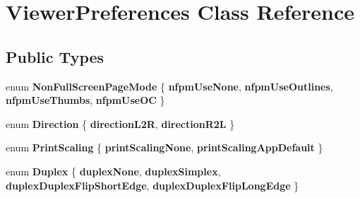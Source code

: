 \hypertarget{class_viewer_preferences}{}\section{Viewer\+Preferences Class Reference}
\label{class_viewer_preferences}
\subsection*{Public Types}
\begin{DoxyCompactItemize}
\item 
\mbox{\label{class_viewer_preferences_abfa43efd57a8a7268660e7488c43b4f8}} 
enum {\bfseries Non\+Full\+Screen\+Page\+Mode} \{ {\bfseries nfpm\+Use\+None}, 
{\bfseries nfpm\+Use\+Outlines}, 
{\bfseries nfpm\+Use\+Thumbs}, 
{\bfseries nfpm\+Use\+OC}
 \}
\item 
\mbox{\label{class_viewer_preferences_a34e74e0cd424dbee19207847dcadc93b}} 
enum {\bfseries Direction} \{ {\bfseries direction\+L2R}, 
{\bfseries direction\+R2L}
 \}
\item 
\mbox{\label{class_viewer_preferences_ae9b49471b25fe50734402f7383a314cd}} 
enum {\bfseries Print\+Scaling} \{ {\bfseries print\+Scaling\+None}, 
{\bfseries print\+Scaling\+App\+Default}
 \}
\item 
\mbox{\label{class_viewer_preferences_afd092a591aa7ae389e9b5408843ad61c}} 
enum {\bfseries Duplex} \{ {\bfseries duplex\+None}, 
{\bfseries duplex\+Simplex}, 
{\bfseries duplex\+Duplex\+Flip\+Short\+Edge}, 
{\bfseries duplex\+Duplex\+Flip\+Long\+Edge}
 \}
\end{DoxyCompactItemize}
